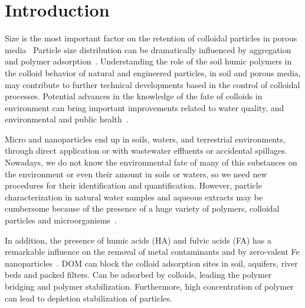 \documentclass[journal=langd5,manuscript=article]{achemso}
\begin{document}
\section{Introduction}
Size is the most important factor on the retention of colloidal particles in porous media~\cite{Sirivithayapakorn2003,Sen2006}
Particle size distribution can be dramatically influenced by aggregation and polymer adsorption~\cite{Fang2009}.
Understanding  the role of the soil humic polymers in the colloid behavior of natural and engineered particles, in soil and porous media, may contribute to further technical developments based in the control of colloidal processes. Potential advances  in the knowledge of the fate of colloids in environment can bring important improvements related to water quality, and environmental and public health~\cite{Ngo2008,Farre2011}.

Micro and nanoparticles end up in soils, waters, and  terrestrial environments, through direct application or with wastewater effluents or accidental spillages. Nowadays, we do not know the environmental fate of many of this substances on the environment or even their amount in soils or waters, so we need new procedures for their identification and quantification. However, particle characterization in natural water samples and aqueous extracts may be cumbersome because of the presence of a huge variety of polymers, colloidal particles and microorganisms~\cite{Ngo2008}. 


In addition, the presence of humic acids (HA) and fulvic acids (FA) has a remarkable influence on the removal of metal contaminants 
  and   by zero-valent Fe nanoparticles~\cite{Mak2011234}.
DOM can block the colloid adsorption sites in soil,  aquifers, river beds and packed filters. Can be adsorbed by colloids,  leading the polymer bridging and polymer stabilization. Furthermore,   high concentration of polymer can lead to depletion stabilization of  particles. 
\end{document}
